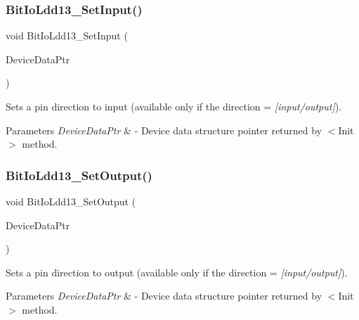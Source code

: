 \subsubsection{\texorpdfstring{Bit\+Io\+Ldd13\+\_\+\+Set\+Input()}{BitIoLdd13\_SetInput()}}
{\footnotesize\ttfamily void Bit\+Io\+Ldd13\+\_\+\+Set\+Input (\begin{DoxyParamCaption}\item[{\hyperlink{group___p_e___types__module_gac5cf1362f1f0e3a2ce71b1bf2276d091}{L\+D\+D\+\_\+\+T\+Device\+Data} $\ast$}]{Device\+Data\+Ptr }\end{DoxyParamCaption})}



Sets a pin direction to input (available only if the direction = {\itshape \mbox{[}input/output\mbox{]}}). 


\begin{DoxyParams}{Parameters}
{\em Device\+Data\+Ptr} & -\/ Device data structure pointer returned by $<$\+Init$>$ method. \\
\hline
\end{DoxyParams}
\mbox{\label{group___bit_io_ldd13__module_ga093dde10b8ace24f9342126bad933a77}} 
\subsubsection{\texorpdfstring{Bit\+Io\+Ldd13\+\_\+\+Set\+Output()}{BitIoLdd13\_SetOutput()}}
{\footnotesize\ttfamily void Bit\+Io\+Ldd13\+\_\+\+Set\+Output (\begin{DoxyParamCaption}\item[{\hyperlink{group___p_e___types__module_gac5cf1362f1f0e3a2ce71b1bf2276d091}{L\+D\+D\+\_\+\+T\+Device\+Data} $\ast$}]{Device\+Data\+Ptr }\end{DoxyParamCaption})}



Sets a pin direction to output (available only if the direction = {\itshape \mbox{[}input/output\mbox{]}}). 


\begin{DoxyParams}{Parameters}
{\em Device\+Data\+Ptr} & -\/ Device data structure pointer returned by $<$\+Init$>$ method. \\
\hline
\end{DoxyParams}
\mbox{\label{group___bit_io_ldd13__module_ga6525bcbb0341b742d9180be475410ac1}} 
